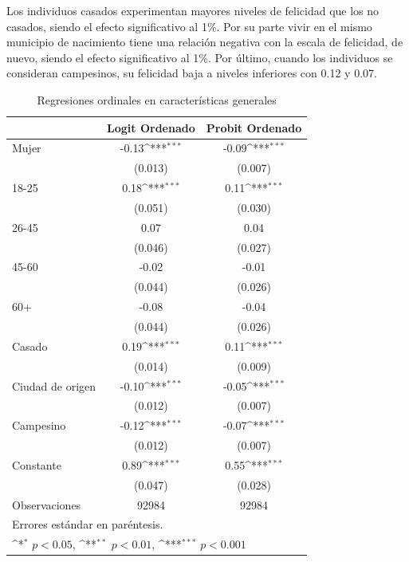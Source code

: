 \documentclass[12pt,spanish]{article}
\begin{document}
Los individuos casados experimentan mayores niveles de felicidad que los no casados, siendo el efecto significativo al 1\%. Por su parte vivir en el mismo municipio de nacimiento tiene una relación negativa con la escala de felicidad, de nuevo, siendo el efecto significativo al 1\%. Por último, cuando los individuos se consideran campesinos, su felicidad baja a niveles inferiores con 0.12 y 0.07. 
\begin{table}[H]
    \centering
    \caption{Regresiones ordinales en características generales}
    {
\def\sym#1{\ifmmode^{#1}\else\(^{#1}\)\fi}
\begin{tabular}{l*{2}{c}}
\hline\hline
            &\multicolumn{1}{c}{Logit Ordenado}&\multicolumn{1}{c}{Probit Ordenado}\\
\hline
Mujer       &       -0.13\sym{***}&       -0.09\sym{***}\\
            &     (0.013)         &     (0.007)         \\
[1em]
18-25           &        0.18\sym{***}&        0.11\sym{***}\\
            &     (0.051)         &     (0.030)         \\
[1em]
26-45           &        0.07         &        0.04         \\
            &     (0.046)         &     (0.027)         \\
[1em]
45-60           &       -0.02         &       -0.01         \\
            &     (0.044)         &     (0.026)         \\
[1em]
60+          &       -0.08         &       -0.04         \\
            &     (0.044)         &     (0.026)         \\
[1em]
Casado      &        0.19\sym{***}&        0.11\sym{***}\\
            &     (0.014)         &     (0.009)         \\
[1em]
Ciudad de origen         &       -0.10\sym{***}&       -0.05\sym{***}\\
            &     (0.012)         &     (0.007)         \\
[1em]
Campesino   &       -0.12\sym{***}&       -0.07\sym{***}\\
            &     (0.012)         &     (0.007)         \\
Constante      &        0.89\sym{***}&        0.55\sym{***}\\
            &     (0.047)         &     (0.028)         \\
\hline
Observaciones       &       92984         &       92984         \\
\hline\hline
        \multicolumn{12}{l}{\footnotesize Errores estándar en paréntesis.}\\
        \multicolumn{12}{l}{\footnotesize \sym{*} \(p<0.05\), \sym{**} \(p<0.01\), \sym{***} \(p<0.001\)}\\
\end{tabular}
}
    \label{tab:tab4}
\end{table}
\end{document}
